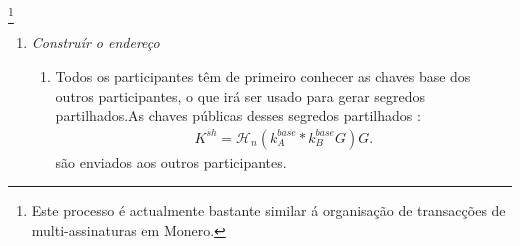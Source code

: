 \footnote{Este processo é actualmente bastante similar á organisação de transacções de multi-assinaturas em Monero.}  
\begin{enumerate}
    \item {\em Construír o endereço}
    \begin{enumerate}
        \item Todos os participantes têm de primeiro conhecer as chaves base dos outros participantes, o que irá ser usado para gerar segredos partilhados.\newline As chaves públicas desses segredos partilhados : 
\begin{align*}
K^{sh} = \mathcal{H}_n(k^{base}_A*k^{base}_B G) G .
\end{align*}
são enviados aos outros participantes.


\end{enumerate}
\end{enumerate}
